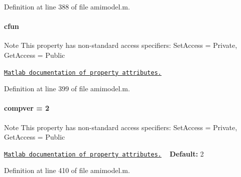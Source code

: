 Definition at line 388 of file amimodel.\+m.

\hypertarget{classamimodel_afec809c626a350367485aa6aaea6b585}{}
\paragraph[{cfun}]{\setlength{\rightskip}{0pt plus 5cm}cfun}\label{classamimodel_afec809c626a350367485aa6aaea6b585}
\begin{DoxyNote}{Note}
This property has non-\/standard access specifiers\+: {\ttfamily Set\+Access = Private, Get\+Access = Public} 

\href{http://www.mathworks.com/help/matlab/matlab_oop/property-attributes.html}{\tt Matlab documentation of property attributes.} 
\end{DoxyNote}


Definition at line 399 of file amimodel.\+m.

\hypertarget{classamimodel_a0a9e4caf628a02e6db68e91c2de6f382}{}
\paragraph[{compver}]{\setlength{\rightskip}{0pt plus 5cm}compver = 2}\label{classamimodel_a0a9e4caf628a02e6db68e91c2de6f382}
\begin{DoxyNote}{Note}
This property has non-\/standard access specifiers\+: {\ttfamily Set\+Access = Private, Get\+Access = Public} 

\href{http://www.mathworks.com/help/matlab/matlab_oop/property-attributes.html}{\tt Matlab documentation of property attributes.} ~\newline
{\bfseries Default\+:} 2 
\end{DoxyNote}


Definition at line 410 of file amimodel.\+m.

